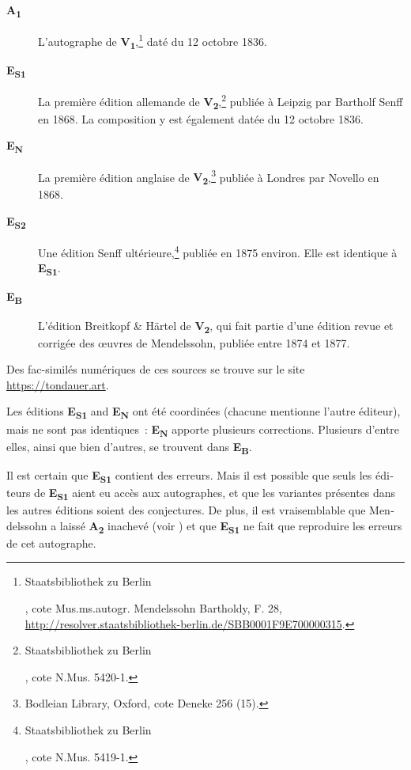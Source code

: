 \documentclass[a4paper, 12pt]{book}
\newcommand{\source}[2]{\textbf{#1\textsubscript{#2}}}
\begin{document}
{\begin{otherlanguage}{french}
    \begin{description}
    \item[\source{A}{1}] L'autographe de
      \source{V}{1},\footnote{\begin{otherlanguage}{ngerman}Staatsbibliothek
          zu Berlin\end{otherlanguage}, cote
          Mus.ms.autogr. Mendelssohn Bartholdy, F. 28,
          \url{http://resolver.staatsbibliothek-berlin.de/SBB0001F9E700000315}.}
      daté du 12 octobre 1836.
    \item[\source{E}{S1}] La première édition allemande de
      \source{V}{2},\footnote{\begin{otherlanguage}{ngerman}Staatsbibliothek
          zu Berlin\end{otherlanguage}, \foreignlanguage{french}{cote} N.Mus. 5420-1.}
      publiée à Leipzig par Bartholf Senff en 1868. La composition y est également
      datée du 12 octobre 1836.
    \item[\source{E}{N}] La première édition anglaise de
      \source{V}{2},\footnote{Bodleian Library, Oxford, \foreignlanguage{french}{cote}
        Deneke 256 (15).} publiée à Londres par Novello en 1868.
    \item[\source{E}{S2}] Une édition Senff
      ultérieure,\footnote{\begin{otherlanguage}{ngerman}Staatsbibliothek
      zu Berlin\end{otherlanguage}, \foreignlanguage{french}{cote} N.Mus. 5419-1.}
      publiée en 1875 environ. Elle est identique à \source{E}{S1}.
    \item[\source{E}{B}] L'édition Breitkopf \& Härtel de
      \source{V}{2},
      qui fait partie d'une édition revue et corrigée des \oe uvres de Mendelssohn,
      publiée entre 1874 et 1877.
    \end{description}

    Des fac-similés numériques de ces sources se trouve sur le site
    \url{https://tondauer.art}.

    Les éditions \source{E}{S1} and \source{E}{N} ont été coordinées
    (chacune mentionne l'autre éditeur), mais ne sont pas identiques~:
    \source{E}{N} apporte plusieurs corrections. Plusieurs d'entre
    elles, ainsi que bien d'autres, se trouvent dans \source{E}{B}.

    Il est certain que \source{E}{S1} contient des erreurs. Mais il
    est possible que seuls les éditeurs de \source{E}{S1} aient eu
    accès aux autographes, et que les variantes présentes dans les
    autres éditions soient des conjectures. De plus, il est
    vraisemblable que Mendelssohn a laissé \source{A}{2} inachevé
    (voir ) et que \source{E}{S1} ne fait que
    reproduire les erreurs de cet autographe.


\end{otherlanguage}}
\end{document}

